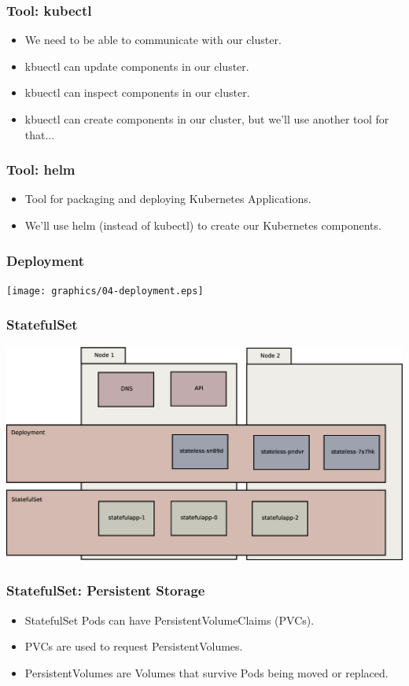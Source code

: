 \documentclass{beamer}
\begin{document}
\begin{frame}
\frametitle{Tool: kubectl\footnotemark}
\begin{itemize}
\item We need to be able to communicate with our cluster.
\item kbuectl can update components in our cluster.
\item kbuectl can inspect components in our cluster.
\item kbuectl can create components in our cluster, but we'll use another tool for that...
\end{itemize}
\end{frame}

\begin{frame}
\frametitle{Tool: helm\footnotemark}
\begin{itemize}
    \item Tool for packaging and deploying Kubernetes Applications.
    \item We'll use helm (instead of kubectl) to create our Kubernetes components.
\end{itemize}
\end{frame}

\begin{frame}
    \frametitle{Deployment}
    \texttt{[image: graphics/04-deployment.eps]}
\end{frame}

\begin{frame}
    \frametitle{StatefulSet}
    \includegraphics[width=\textwidth,height=0.85\textheight,keepaspectratio]{graphics/05-statefulSet.eps}
\end{frame}

\begin{frame}
    \frametitle{StatefulSet: Persistent Storage}
    \begin{itemize}
        \item StatefulSet Pods can have PersistentVolumeClaims (PVCs).
        \item PVCs are used to request PersistentVolumes.
        \item PersistentVolumes are Volumes that survive Pods being moved or replaced.
    \end{itemize}
\end{frame}
\end{document}
